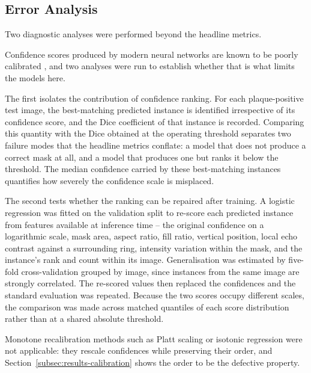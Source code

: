 \subsection{Error Analysis}
\label{subsec:calibration-analysis}
Two diagnostic analyses were performed beyond the headline metrics.

Confidence scores produced by modern neural networks are known to be poorly calibrated
\cite{guo2017calibration}, and two analyses were run to establish whether that is what limits
the models here.

The first isolates the contribution of confidence ranking. For each plaque-positive test image,
the best-matching predicted instance is identified irrespective of its confidence score, and the
Dice coefficient of that instance is recorded. Comparing this quantity with the Dice obtained at
the operating threshold separates two failure modes that the headline metrics conflate: a model
that does not produce a correct mask at all, and a model that produces one but ranks it below the
threshold. The median confidence carried by these best-matching instances quantifies how severely
the confidence scale is misplaced.

The second tests whether the ranking can be repaired after training. A logistic regression was
fitted on the validation split to re-score each predicted instance from features available at
inference time -- the original confidence on a logarithmic scale, mask area, aspect ratio, fill
ratio, vertical position, local echo contrast against a surrounding ring, intensity variation
within the mask, and the instance's rank and count within its image. Generalisation was estimated
by five-fold cross-validation grouped by image, since instances from the same image are strongly
correlated. The re-scored values then replaced the confidences and the standard evaluation was
repeated. Because the two scores occupy different scales, the comparison was made across matched
quantiles of each score distribution rather than at a shared absolute threshold.

Monotone recalibration methods such as Platt scaling \cite{platt1999probabilistic} or isotonic regression
\cite{zadrozny2002transforming} were not applicable: they rescale confidences while preserving
their order, and Section~\ref{subsec:results-calibration} shows the order to be the defective
property.
